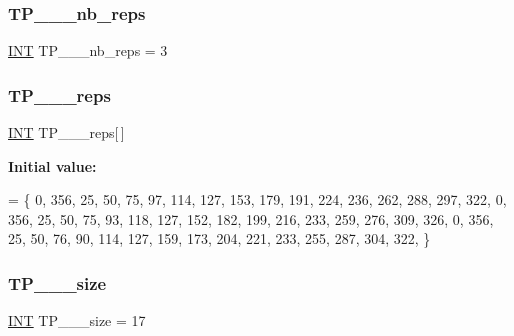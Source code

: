 \mbox{\label{data___t_p_8_c_a1ba796c7b1bb7db1c37ee7e5c2c2cd5a}} 
\subsubsection{\texorpdfstring{T\+P\+\_\+\_\+\_\+nb\+\_\+reps}{TP\_4\_2\_nb\_reps}}
{\footnotesize\ttfamily \mbox{\hyperlink{galois_8h_a09fddde158a3a20bd2dcadb609de11dc}{I\+NT}} T\+P\+\_\+\_\+\_\+nb\+\_\+reps = 3}

\mbox{\label{data___t_p_8_c_a63506b47eca1c0f658917cd592f9ad58}} 
\subsubsection{\texorpdfstring{T\+P\+\_\+\_\+\_\+reps}{TP\_4\_2\_reps}}
{\footnotesize\ttfamily \mbox{\hyperlink{galois_8h_a09fddde158a3a20bd2dcadb609de11dc}{I\+NT}} T\+P\+\_\+\_\+\_\+reps\mbox{[}$\,$\mbox{]}}

{\bfseries Initial value\+:}
\begin{DoxyCode}
= \{
    0, 356, 25, 50, 75, 97, 114, 127, 153, 179, 191, 224, 236, 262, 288, 297, 322, 
    0, 356, 25, 50, 75, 93, 118, 127, 152, 182, 199, 216, 233, 259, 276, 309, 326, 
    0, 356, 25, 50, 76, 90, 114, 127, 159, 173, 204, 221, 233, 255, 287, 304, 322, 
\}
\end{DoxyCode}
\mbox{\label{data___t_p_8_c_aef761f04f965ba6fddec7b0035453d7f}} 
\subsubsection{\texorpdfstring{T\+P\+\_\+\_\+\_\+size}{TP\_4\_2\_size}}
{\footnotesize\ttfamily \mbox{\hyperlink{galois_8h_a09fddde158a3a20bd2dcadb609de11dc}{I\+NT}} T\+P\+\_\+\_\+\_\+size = 17}

